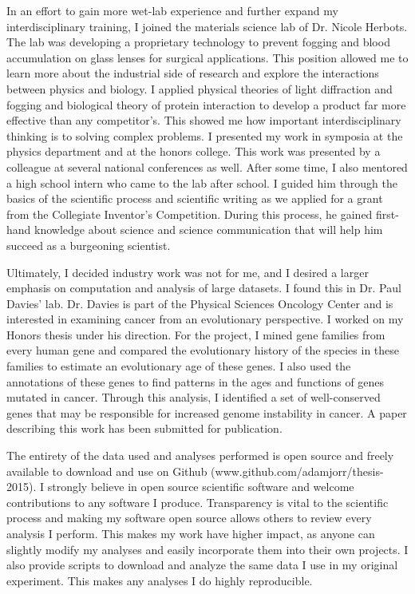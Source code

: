 \documentclass[12pt]{article}
\begin{document}
In an effort to gain more wet-lab experience and further expand my interdisciplinary training, I joined the materials science lab of Dr. Nicole Herbots. The lab was developing a proprietary technology to prevent fogging and blood accumulation on glass lenses for surgical applications. This position allowed me to learn more about the industrial side of research and explore the interactions between physics and biology. I applied physical theories of light diffraction and fogging and biological theory of protein interaction to develop a product far more effective than any competitor's. This showed me how important interdisciplinary thinking is to solving complex problems. I presented my work in symposia at the physics department and at the honors college. This work was presented by a colleague at several national conferences as well. After some time, I also mentored a high school intern who came to the lab after school. I guided him through the basics of the scientific process and scientific writing as we applied for a grant from the Collegiate Inventor's Competition. During this process, he gained first-hand knowledge about science and science communication that will help him succeed as a burgeoning scientist.

Ultimately, I decided industry work was not for me, and I desired a larger emphasis on computation and analysis of large datasets. I found this in Dr. Paul Davies' lab. Dr. Davies is part of the Physical Sciences Oncology Center and is interested in examining cancer from an evolutionary perspective.
I worked on my Honors thesis under his direction. For the project, I mined gene families from every human gene and compared the evolutionary history of the species in these families to estimate an evolutionary age of these genes. I also used the annotations of these genes to find patterns in the ages and functions of genes mutated in cancer. Through this analysis, I identified a set of well-conserved genes that may be responsible for increased genome instability in cancer. A paper describing this work has been submitted for publication.

The entirety of the data used and analyses performed is open source and freely available to download and use on Github (www.github.com/adamjorr/thesis-2015). I strongly believe in open source scientific software and welcome contributions to any software I produce. Transparency is vital to the scientific process and making my software open source allows others to review every analysis I perform. This makes my work have higher impact, as anyone can slightly modify my analyses and easily incorporate them into their own projects. I also provide scripts to download and analyze the same data I use in my original experiment. This makes any analyses I do highly reproducible.
\end{document}
